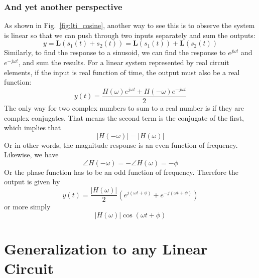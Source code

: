\subsubsection{And yet another perspective}
As shown in Fig.~\ref{fig:lti_cosine}, another way to see this is to observe the system is linear so that we can push through two inputs separately and sum the outputs:
    \begin{equation}
        y = \mathbf{L}(s_1(t) + s_2(t)) = \mathbf{L}(s_1(t)) + \mathbf{L}(s_2(t))
    \end{equation}
Similarly, to find the response to a sinusoid, we can find the response to $e^{j\omega t}$ and $e^{-j\omega t}$, and sum the results.  For a linear system represented by real circuit elements, if  the input is real function of time, the output must also be a real function:
    \begin{equation}
        y(t) = \frac{H(\omega) e^{j\omega t} + H(-\omega) e^{-j\omega t} }{2}
    \end{equation}
The only way for two complex numbers to sum to a real number is if they are complex conjugates.  That means the second term is the conjugate of the first, which implies that
    \begin{equation}
        |H(-\omega)| = |H(\omega)|
    \end{equation}
Or in other words, the magnitude response is an even function of frequency.  Likewise, we have
    \begin{equation}
        \angle H(-\omega) = -\angle H(\omega) = - \phi
    \end{equation}
Or the phase function has to be an odd function of frequency.  Therefore the output is given by
    \begin{equation}
        y(t) = \frac{|H(\omega)|}{2} \left( e^{j(\omega t + \phi)} + e^{-j(\omega t + \phi)} \right)
    \end{equation}
or more simply
    \begin{equation}
        |H(\omega)| \cos(\omega t + \phi)
    \end{equation}
\section{Generalization to any Linear Circuit}
